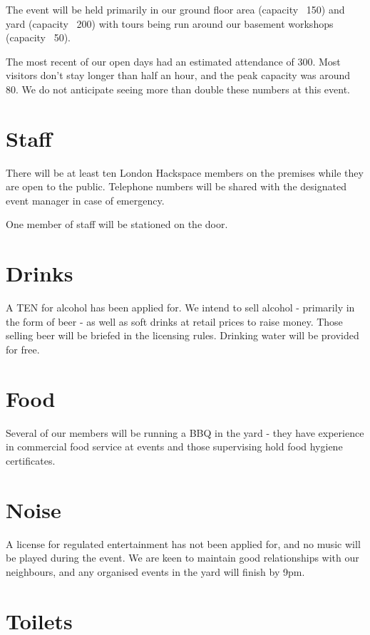 The event will be held primarily in our ground floor area (capacity ~150) and yard
(capacity ~200) with tours being run around our basement workshops (capacity ~50).

The most recent of our open days had an estimated attendance of 300. Most visitors
don't stay longer than half an hour, and the peak capacity was around 80. We do not
anticipate seeing more than double these numbers at this event.

\section{Staff}

There will be at least ten London Hackspace members on the premises while they are
open to the public. Telephone numbers will be shared with the designated event
  manager in case of emergency.

One member of staff will be stationed on the door.

\section{Drinks}

A TEN for alcohol has been applied for. We intend to sell alcohol - primarily in the
form of beer - as well as soft drinks at retail prices to raise money. Those selling
beer will be briefed in the licensing rules. Drinking water will be provided for free.

\section{Food}

Several of our members will be running a BBQ in the yard - they have experience in
commercial food service at events and those supervising hold food hygiene certificates.

\section{Noise}

A license for regulated entertainment has not been applied for, and no music will be
played during the event. We are keen to maintain good relationships with our neighbours,
and any organised events in the yard will finish by 9pm.

\section{Toilets}


